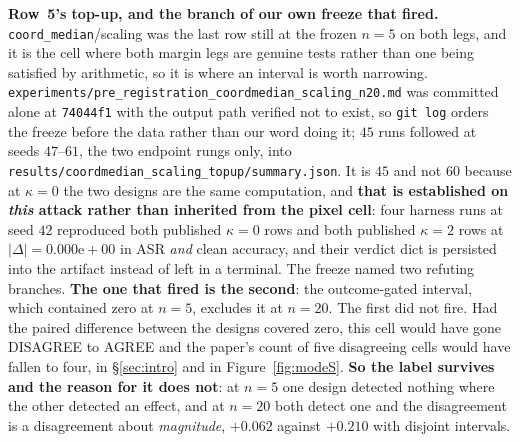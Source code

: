 \documentclass{article}
\begin{document}
\textbf{Row~5's top-up, and the branch of our own freeze that fired.} \texttt{coord\_median}/scaling was the last row still at the frozen $n{=}5$ on both legs, and it is the cell where both margin legs are genuine tests rather than one being satisfied by arithmetic, so it is where an interval is worth narrowing. \texttt{experiments/\allowbreak pre\_registration\_\allowbreak coordmedian\_\allowbreak scaling\_\allowbreak n20.md} was committed alone at \texttt{74044f1} with the output path verified not to exist, so \texttt{git log} orders the freeze before the data rather than our word doing it; $45$ runs followed at seeds $47$--$61$, the two endpoint rungs only, into \texttt{results/\allowbreak coordmedian\_\allowbreak scaling\_\allowbreak topup/\allowbreak summary.json}. It is $45$ and not $60$ because at $\kappa{=}0$ the two designs are the same computation, and \textbf{that is established on \emph{this} attack rather than inherited from the pixel cell}: four harness runs at seed $42$ reproduced both published $\kappa{=}0$ rows and both published $\kappa{=}2$ rows at $|\Delta| = 0.000\mathrm{e}{+}00$ in ASR \emph{and} clean accuracy, and their verdict dict is persisted into the artifact instead of left in a terminal. The freeze named two refuting branches. \textbf{The one that fired is the second}: the outcome-gated interval, which contained zero at $n{=}5$, excludes it at $n{=}20$. The first did not fire. Had the paired difference between the designs covered zero, this cell would have gone DISAGREE to AGREE and the paper's count of five disagreeing cells would have fallen to four, in §\ref{sec:intro} and in Figure~\ref{fig:modeS}. \textbf{So the label survives and the reason for it does not}: at $n{=}5$ one design detected nothing where the other detected an effect, and at $n{=}20$ both detect one and the disagreement is a disagreement about \emph{magnitude}, $+0.062$ against $+0.210$ with disjoint intervals.
\end{document}
